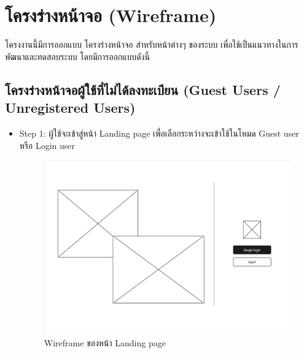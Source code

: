 \section{โครงร่างหน้าจอ (Wireframe)}
\begin{mypara}
    \indent โครงงานนี้มีการออกแบบ โครงร่างหน้าจอ สำหรับหน้าต่างๆ ของระบบ 
    เพื่อใช้เป็นแนวทางในการพัฒนาและทดสอบระบบ โดยมีการออกแบบดังนี้

\subsection{โครงร่างหน้าจอผู้ใช้ที่ไม่ได้ลงทะเบียน (Guest Users / Unregistered Users)}
\begin{itemize}
    \item Step 1: ผู้ใช้จะเข้าสู่หน้า Landing page เพื่อเลือกระหว่างจะเข้าใช้ในโหมด Guest user หรือ Login user
      \begin{figure}[H]
        \centering
        \includegraphics[scale=0.35]
        {homepage.png}
        \caption{Wireframe ของหน้า Landing page}
        \label{fig:WireframeHomepage}
      \end{figure}


\end{itemize}
\end{mypara}
